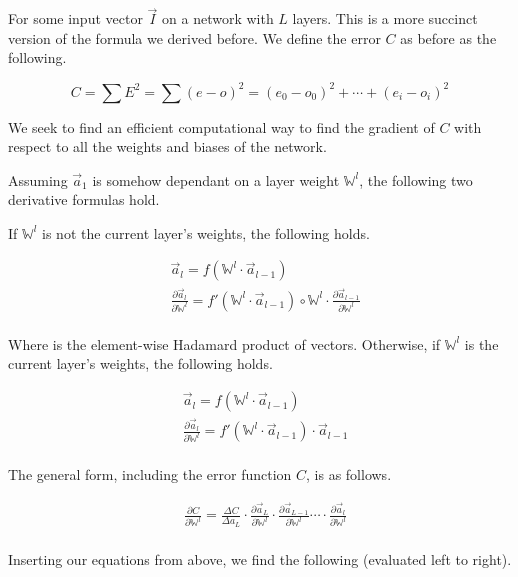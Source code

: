 \documentclass[8pt]{amsart}
\newcommand\mat[1]{\mathbb{#1}}
\begin{document}
For some input vector $\vec{I}$ on a network with $L$ layers. This is a more
succinct version of the formula we derived before. We define the error $C$ as
before as the following.

\[
    C = \sum E^2 = \sum (e - o)^2 = (e_0 - o_0)^2 + \cdots + (e_i - o_i)^2
\]

We seek to find an efficient computational way to find the gradient of $C$ with
respect to all the weights and biases of the network.

Assuming $\vec{a}_1$ is somehow dependant on a layer weight $\mat{W}^l$, the following two
derivative formulas hold.

If $\mat{W}^l$ is not the current layer's weights, the following holds.

\[
    \begin{aligned}
        & \vec{a}_l = f(\mat{W}^l \cdot \vec{a}_{l - 1}) \\
        & \frac{ \partial \vec{a}_l }{ \partial \mat{W}^l } =
            f'(\mat{W}^l \cdot \vec{a}_{l - 1}) \circ \mat{W}^l
            \cdot \frac{ \partial \vec{a}_{l - 1} }{ \partial \mat{W}^l } \\
    \end{aligned}
\]

Where \circ is the element-wise Hadamard product of vectors. Otherwise, if $\mat{W}^l$
is the current layer's weights, the following holds.

\[
    \begin{aligned}
        & \vec{a}_l = f(\mat{W}^l \cdot \vec{a}_{l - 1}) \\
        & \frac{ \partial \vec{a}_l }{ \partial \mat{W}^l } =
            f'(\mat{W}^l \cdot \vec{a}_{l - 1}) \cdot \vec{a}_{l - 1} \\
    \end{aligned}
\]

The general form, including the error function $C$, is as follows.

\[
    \begin{aligned}
        & \frac{ \partial C }{ \partial \mat{W}^l } = \frac{ \Delta C }{ \Delta a_L }
            \cdot \frac{ \partial \vec{a}_L }{ \partial \mat{W}^l }
            \cdot \frac{ \partial \vec{a}_{L - 1} }{ \partial \mat{W}^l }
            \cdots
            \cdot \frac{ \partial \vec{a}_l }{ \partial \mat{W}^l } \\
    \end{aligned}
\]

Inserting our equations from above, we
find the following (evaluated left to right).
\end{document}
